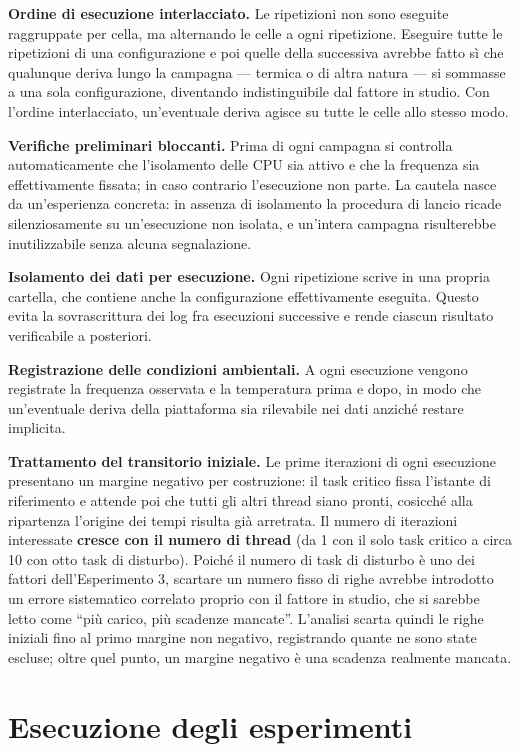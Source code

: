 \documentclass[11pt,a4paper]{article}
\begin{document}
\textbf{Ordine di esecuzione interlacciato.} Le ripetizioni non sono eseguite raggruppate per cella,
ma alternando le celle a ogni ripetizione. Eseguire tutte le ripetizioni di una configurazione e
poi quelle della successiva avrebbe fatto s\`i che qualunque deriva lungo la campagna --- termica o
di altra natura --- si sommasse a una sola configurazione, diventando indistinguibile dal fattore in
studio. Con l'ordine interlacciato, un'eventuale deriva agisce su tutte le celle allo stesso modo.

\textbf{Verifiche preliminari bloccanti.} Prima di ogni campagna si controlla automaticamente che
l'isolamento delle CPU sia attivo e che la frequenza sia effettivamente fissata; in caso contrario
l'esecuzione non parte. La cautela nasce da un'esperienza concreta: in assenza di isolamento la
procedura di lancio ricade silenziosamente su un'esecuzione non isolata, e un'intera campagna
risulterebbe inutilizzabile senza alcuna segnalazione.

\textbf{Isolamento dei dati per esecuzione.} Ogni ripetizione scrive in una propria cartella, che
contiene anche la configurazione effettivamente eseguita. Questo evita la sovrascrittura dei log
fra esecuzioni successive e rende ciascun risultato verificabile a posteriori.

\textbf{Registrazione delle condizioni ambientali.} A ogni esecuzione vengono registrate la
frequenza osservata e la temperatura prima e dopo, in modo che un'eventuale deriva della
piattaforma sia rilevabile nei dati anzich\'e restare implicita.

\textbf{Trattamento del transitorio iniziale.} Le prime iterazioni di ogni esecuzione presentano un
margine negativo per costruzione: il task critico fissa l'istante di riferimento e attende poi che
tutti gli altri thread siano pronti, cosicch\'e alla ripartenza l'origine dei tempi risulta gi\`a
arretrata. Il numero di iterazioni interessate \textbf{cresce con il numero di thread} (da 1 con il
solo task critico a circa 10 con otto task di disturbo). Poich\'e il numero di task di disturbo \`e
uno dei fattori dell'Esperimento 3, scartare un numero fisso di righe avrebbe introdotto un errore
sistematico correlato proprio con il fattore in studio, che si sarebbe letto come ``pi\`u carico,
pi\`u scadenze mancate''. L'analisi scarta quindi le righe iniziali fino al primo margine non
negativo, registrando quante ne sono state escluse; oltre quel punto, un margine negativo \`e una
scadenza realmente mancata.

\section{Esecuzione degli esperimenti}
\end{document}

